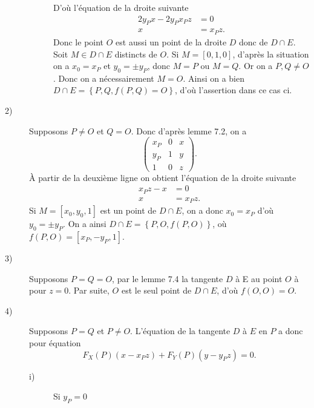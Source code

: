 \begin{demonstration}
\begin{description}
\begin{description}
               D'où l'équation de la droite suivante
               \begin{align*}
                   2y_Px - 2y_Px_Pz &= 0 \\
                   x &= x_Pz
               .\end{align*}
               Donc le point $O$ est aussi un point de la droite $D$ donc de $D \cap E$.  Soit $M \in  D \cap E$ distincts de $O$. Si $M = \left[ 0,1,0 \right]$, d'après la situation on a $x_0 =
               x_P$ et $y_0 = \pm y_P$, donc $M = P$ ou $M = Q$. Or on a $P,Q \neq O$. Donc on a nécessairement $M = O$. Ainsi on a bien $D \cap E = \left\{ P, Q, f(P,Q)= O \right\}$, d'où
               l'assertion dans ce cas ci.
            \end{description}
        \item[2)] Supposons $P \neq O$ et $Q = O$. Donc d'après lemme 7.2, on a
            \[
            \begin{pmatrix}
                x_P & 0 & x \\
                y_P & 1 & y \\
                1   & 0 & z
            \end{pmatrix}
            .\] 
            À partir de la deuxième ligne on obtient l'équation de la droite suivante
            \begin{align*}
                x_Pz - x &= 0 \\
                x &= x_Pz
            .\end{align*}
            Si $M = \left[ x_0, y_0, 1 \right]$ est un point de $D \cap E$, on a donc $x_0 = x_P$ d'où $y_0 = \pm y_P$.
        On a ainsi $D \cap E = \left\{ P, O, f(P,O) \right\}$, où $f(P,O) = \left[ x_P, - y_P, 1 \right]$.
    \item[3)] Supposons $P = Q = O$, par le lemme 7.4 la tangente $D$ à E au point $O$ à pour $z = 0$. Par suite, $O$ est le seul point de $D \cap E$, d'où $f(O,O) = O$.
    \item[4)] Supposons $P = Q$ et $P \neq O$. L'équation de la tangente $D$ à $E$ en $P$ a donc pour équation 
        \[
        F_{X}(P)\left( x - x_Pz \right) + F_{Y}(P)\left( y - y_Pz \right) = 0
        .\] 
        \begin{description}
            \item[i)] Si $y_P = 0$
        \end{description}
    \end{description}
\end{demonstration}
